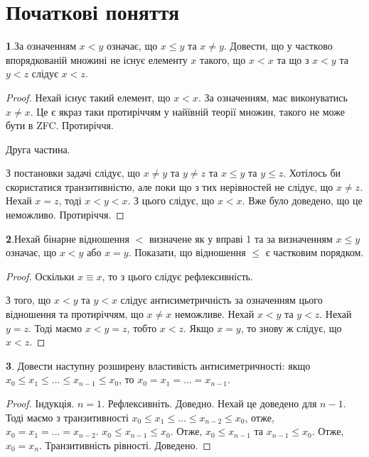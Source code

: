 \documentclass{article}
\begin{document}
\section{Початкові поняття}
\textbf{1}.За означенням $x < y$ означає, що $x \leq y$ та $x \not=y$. Довести, що у частково впорядкованій множині не існує елементу $x$ такого, що $x < x$ та що з $x < y$ та $y < z$ слідує $x < z$.

\begin{proof} Нехай існує такий елемент, що $x < x$. За означенням, має виконуватись $x \not= x$. Це є якраз таки протиріччям у найївній теорії множин, такого не може бути в ZFC. Протиріччя.
    
Друга частина.

З постановки задачі слідує, що $x \neq y$ та $y \neq z$ та $x \leq y$ та $y \leq z$. Хотілось би скористатися транзитивністю, але поки що з тих нерівностей не слідує, що $x \neq z$. Нехай $x = z$, тоді $x < y <x$. З цього слідує, що $x < x$. Вже було доведено, що це неможливо. Протиріччя. 
\end{proof}

\textbf{2}.Нехай бінарне відношення $<$ визначене як у вправі 1 та за визначенням $x \leq y$ означає, що $x < y$ або $x = y$. Показати, що відношення $\leq$ є частковим порядком.
\begin{proof}
    Оскільки $x \equiv x$, то з цього слідує рефлексивність.

З того, що $x < y$ та $y < x$ слідує антисиметричність за означенням цього відношення та протиріччям, що $x \neq x$ неможливе. Нехай $x < y$ та $y < z$. Нехай $y = z$. Тоді маємо $x < y = z$, тобто $x < z$. Якщо $x = y$, то знову ж слідує, що $x < z$.
\end{proof}

\textbf{3}. Довести наступну розширену властивість антисиметричності:
якщо $ x_0\leq x_1 \leq ... \leq x_{n-1} \leq x_0$, то $x_0 = x_1 = ... = x_{n-1}$.

\begin{proof}
    Індукція. $n = 1$. Рефлексивніть. Доведно.
    Нехай це доведено для $n-1$. Тоді маємо з транзитивності $ x_0 \leq x_1 \leq ... \leq x_{n-2} \leq x_0$, отже,   $x_0 = x_1 = ... = x_{n-2}$. $x_0 \leq x_{n-1} \leq x_0$. Отже, $x_0 \leq x_{n-1}$ та $x_{n-1} \leq x_0$. Отже, $x_0 = x_{n}$. Транзитивність рівності. Доведено. 
\end{proof}
\end{document}
